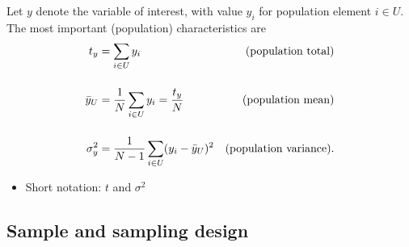 \documentclass{my_eth_beamer}
\numberwithin{equation}{section}
\begin{document}
\begin{frame}
    Let $y$ denote the variable of interest, with value $y_i$ for population
    element $i \in U$. The most important (population) \alert{characteristics}
    are
    \vspace{0.25em}
    \begin{align*}
        t_y &= \sum_{i \in U} y_i & \text{(population total)} \\[1.25em]
        \bar{y}_U &= \frac{1}{N} \sum_{i \in U} y_i = \frac{t_y}{N} &
            \text{(population mean)}\\[1.25em]
        \sigma_y^2 &= \frac{1}{N - 1}\sum_{i \in U} (y_i - \bar{y}_U)^2 &
            \text{(population variance).}
    \end{align*}
    \begin{itemize}
    \setlength{\itemsep}{8pt}
        \item Short notation: $t$ and $\sigma^2$
    \end{itemize}
\end{frame}

\subsection{Sample and sampling design}\label{sec:basics_sample}
\end{document}
